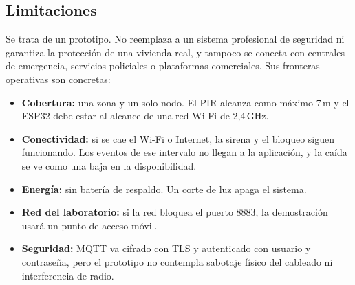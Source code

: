 \documentclass[conference]{IEEEtran}
\begin{document}
\subsection{Limitaciones}
Se trata de un prototipo. No reemplaza a un sistema profesional de seguridad ni garantiza la protección de una vivienda real, y tampoco se conecta con centrales de emergencia, servicios policiales o plataformas comerciales. Sus fronteras operativas son concretas:
\begin{itemize}
  \item \textbf{Cobertura:} una zona y un solo nodo. El PIR alcanza como máximo 7\,m y el ESP32 debe estar al alcance de una red Wi-Fi de 2,4\,GHz.
  \item \textbf{Conectividad:} si se cae el Wi-Fi o Internet, la sirena y el bloqueo siguen funcionando. Los eventos de ese intervalo no llegan a la aplicación, y la caída se ve como una baja en la disponibilidad.
  \item \textbf{Energía:} sin batería de respaldo. Un corte de luz apaga el sistema.
  \item \textbf{Red del laboratorio:} si la red bloquea el puerto 8883, la demostración usará un punto de acceso móvil.
  \item \textbf{Seguridad:} MQTT va cifrado con TLS y autenticado con usuario y contraseña, pero el prototipo no contempla sabotaje físico del cableado ni interferencia de radio.
\end{itemize}
\end{document}
